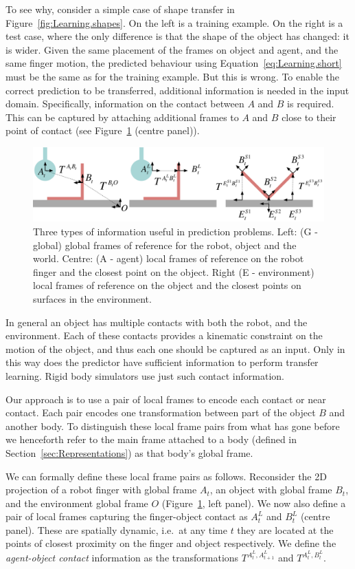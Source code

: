 To see why, consider a simple case of shape transfer in Figure~\ref{fig:Learning.shapes}. On the left is a training example. On the right is a test case, where the only difference is that the shape of the object has changed: it is wider. Given the same placement of the frames on object and agent, and the same finger motion, the predicted behaviour using Equation~\eqref{eq:Learning.short} must be the same as for the training example. But this is wrong. To enable the correct prediction to be transferred, additional information is needed in the input domain. Specifically, information on the contact between $A$ and $B$ is required. This can be captured by attaching additional frames to $A$ and $B$ close to their point of contact (see Figure~\ref{fig:Learning.setup2} (centre panel)).
\begin{figure}[t]
\centerline{\includegraphics[width=\textwidth]{information}}
\caption{Three types of information useful in prediction problems. Left: (G - global) global frames of reference for the robot, object and the world. Centre: (A - agent) local frames of reference on the robot finger and the closest point on the object. Right (E - environment) local frames of reference on the object and the closest points on surfaces in the environment.}
\label{fig:Learning.setup2}
\end{figure}
In general an object has multiple contacts with both the robot, and the environment. Each of these contacts provides a kinematic constraint on the motion of the object, and thus each one should be captured as an input. Only in this way does the predictor have sufficient information to perform transfer learning. Rigid body simulators use just such contact information. 

Our approach is to use a pair of local frames to encode each contact or near contact. Each pair encodes one transformation between part of the object $B$ and another body.  To distinguish these local frame pairs from what has gone before we henceforth refer to the main frame attached to a body (defined in Section~\ref{sec:Representations}) as that body's global frame. 

We can formally define these local frame pairs as follows. Reconsider
the 2D projection of a robot finger with global frame $A_{t}$, an
object with global frame $B_{t}$, and the environment global frame $O$
(Figure~\ref{fig:Learning.setup2}, left panel). We now also define a pair of local frames
capturing the finger-object contact as $A^{L}_{t}$ and
$B^{L}_{t}$ (centre panel). These are spatially dynamic, i.e.\ at any time $t$ they
are located at the points of closest proximity on the finger and
object respectively.  We define the \textit{agent-object contact}
information as the transformations $T^{A^{L}_{t}, A^{L}_{t+1}}$ and
$T^{A^{L}_t, B^{L}_t}$.

